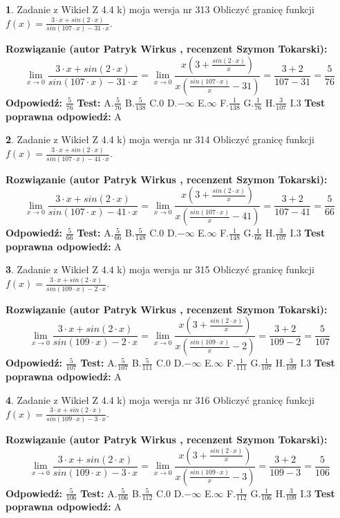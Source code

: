 \documentclass[12pt, a4paper]{article}
\theoremstyle{definition} %
\newtheorem{zad}{}
\newcommand{\zadStart}[1]{\begin{zad}#1\newline}
\newcommand{\zadStop}{\end{zad}}
\newcommand{\rozwStart}[2]{\noindent \textbf{Rozwiązanie (autor #1 , recenzent #2): }\newline}
\newcommand{\rozwStop}{\newline}
\newcommand{\odpStart}{\noindent \textbf{Odpowiedź:}\newline}
\newcommand{\odpStop}{\newline}
\newcommand{\testStart}{\noindent \textbf{Test:}\newline}
\newcommand{\testStop}{\newline}
\newcommand{\kluczStart}{\noindent \textbf{Test poprawna odpowiedź:}\newline}
\newcommand{\kluczStop}{\newline}
\begin{document}
\zadStart{Zadanie z Wikieł Z 4.4 k) moja wersja nr 313}
Obliczyć granicę funkcji $f(x)=\frac{3\cdot x +sin(2\cdot x)}{sin(107\cdot x) -31\cdot x}$.
\zadStop
\rozwStart{Patryk Wirkus}{Szymon Tokarski}
$$\lim\limits_{x\to 0}\frac{3\cdot x +sin(2\cdot x)}{sin(107\cdot x) -31\cdot x}
=\lim\limits_{x\to 0}\frac{x(3+\frac{sin(2\cdot x)}{x})}{x(\frac{sin(107\cdot x)}{x}-31)}
=\frac{3+2}{107-31} = \frac{5}{76}$$
\rozwStop
\odpStart
$\frac{5}{76}$
\odpStop
\testStart
A.$\frac{5}{76}$
B.$\frac{5}{138}$
C.$0$
D.$-\infty$
E.$\infty$
F.$\frac{1}{138}$
G.$\frac{1}{76}$
H.$\frac{3}{107}$
I.$3$
\testStop
\kluczStart
A
\kluczStop



\zadStart{Zadanie z Wikieł Z 4.4 k) moja wersja nr 314}
Obliczyć granicę funkcji $f(x)=\frac{3\cdot x +sin(2\cdot x)}{sin(107\cdot x) -41\cdot x}$.
\zadStop
\rozwStart{Patryk Wirkus}{Szymon Tokarski}
$$\lim\limits_{x\to 0}\frac{3\cdot x +sin(2\cdot x)}{sin(107\cdot x) -41\cdot x}
=\lim\limits_{x\to 0}\frac{x(3+\frac{sin(2\cdot x)}{x})}{x(\frac{sin(107\cdot x)}{x}-41)}
=\frac{3+2}{107-41} = \frac{5}{66}$$
\rozwStop
\odpStart
$\frac{5}{66}$
\odpStop
\testStart
A.$\frac{5}{66}$
B.$\frac{5}{148}$
C.$0$
D.$-\infty$
E.$\infty$
F.$\frac{1}{148}$
G.$\frac{1}{66}$
H.$\frac{3}{107}$
I.$3$
\testStop
\kluczStart
A
\kluczStop



\zadStart{Zadanie z Wikieł Z 4.4 k) moja wersja nr 315}
Obliczyć granicę funkcji $f(x)=\frac{3\cdot x +sin(2\cdot x)}{sin(109\cdot x) -2\cdot x}$.
\zadStop
\rozwStart{Patryk Wirkus}{Szymon Tokarski}
$$\lim\limits_{x\to 0}\frac{3\cdot x +sin(2\cdot x)}{sin(109\cdot x) -2\cdot x}
=\lim\limits_{x\to 0}\frac{x(3+\frac{sin(2\cdot x)}{x})}{x(\frac{sin(109\cdot x)}{x}-2)}
=\frac{3+2}{109-2} = \frac{5}{107}$$
\rozwStop
\odpStart
$\frac{5}{107}$
\odpStop
\testStart
A.$\frac{5}{107}$
B.$\frac{5}{111}$
C.$0$
D.$-\infty$
E.$\infty$
F.$\frac{1}{111}$
G.$\frac{1}{107}$
H.$\frac{3}{109}$
I.$3$
\testStop
\kluczStart
A
\kluczStop



\zadStart{Zadanie z Wikieł Z 4.4 k) moja wersja nr 316}
Obliczyć granicę funkcji $f(x)=\frac{3\cdot x +sin(2\cdot x)}{sin(109\cdot x) -3\cdot x}$.
\zadStop
\rozwStart{Patryk Wirkus}{Szymon Tokarski}
$$\lim\limits_{x\to 0}\frac{3\cdot x +sin(2\cdot x)}{sin(109\cdot x) -3\cdot x}
=\lim\limits_{x\to 0}\frac{x(3+\frac{sin(2\cdot x)}{x})}{x(\frac{sin(109\cdot x)}{x}-3)}
=\frac{3+2}{109-3} = \frac{5}{106}$$
\rozwStop
\odpStart
$\frac{5}{106}$
\odpStop
\testStart
A.$\frac{5}{106}$
B.$\frac{5}{112}$
C.$0$
D.$-\infty$
E.$\infty$
F.$\frac{1}{112}$
G.$\frac{1}{106}$
H.$\frac{3}{109}$
I.$3$
\testStop
\kluczStart
A
\kluczStop
\end{document}
